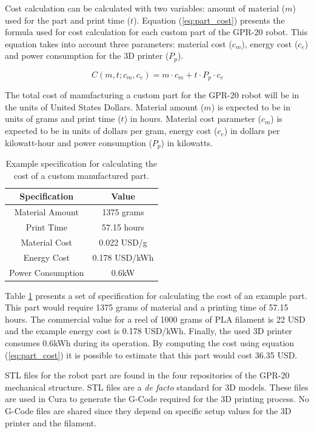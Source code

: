 \documentclass{article}
\begin{document}
Cost calculation can be calculated with two variables: amount of material ($m$) used for the part and print time ($t$). Equation (\ref{eq:part_cost}) presents the formula used for cost calculation for each custom part of the GPR-20 robot. This equation takes into account three parameters: material cost ($c_{m}$), energy cost ($c_{e}$) and power consumption for the 3D printer ($P_p$).

\begin{equation}
    C(m, t; c_{m}, c_{e}) = m \cdot c_m + t \cdot P_p \cdot c_e
    \label{eq:part_cost}
\end{equation}

The total cost of manufacturing a custom part for the GPR-20 robot will be in the units of United States Dollars. Material amount ($m$) is expected to be in units of grams and print time ($t$) in hours. Material cost parameter ($c_m$) is expected to be in units of dollars per gram, energy cost ($c_e$) in dollars per kilowatt-hour and power consumption ($P_p$) in kilowatts.

\begin{table}[h]
    \centering
    \begin{tabular}{|c|c|}
        \textbf{Specification} & \textbf{Value} \\ \hline
        Material Amount & 1375 grams \\
        Print Time & 57.15 hours \\
        Material Cost & 0.022 USD/g \\
        Energy Cost & 0.178 USD/kWh \\
        Power Consumption & 0.6kW \\
    \end{tabular}
    \caption{Example specification for calculating the cost of a custom manufactured part.}
    \label{tab:cost_example}
\end{table}

Table \ref{tab:cost_example} presents a set of specification for calculating the cost of an example part. This part would require 1375 grams of material and a printing time of 57.15 hours. The commercial value for a reel of 1000 grams of PLA filament is 22 USD and the example energy cost is 0.178 USD/kWh. Finally, the used 3D printer consumes 0.6kWh during its operation. By computing the cost using equation (\ref{eq:part_cost}) it is possible to estimate that this part would cost 36.35 USD.

STL files for the robot part are found in the four repositories of the GPR-20 mechanical structure. STL files are a \textit{de facto} standard for 3D models. These files are used in Cura to generate the G-Code required for the 3D printing process. No G-Code files are shared since they depend on specific setup values for the 3D printer and the filament.
\end{document}

